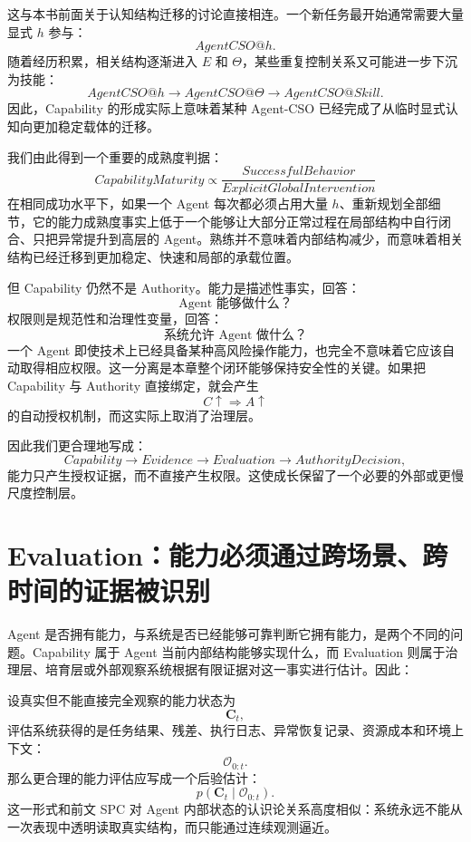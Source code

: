 这与本书前面关于认知结构迁移的讨论直接相连。一个新任务最开始通常需要大量显式 $h$ 参与：
\[
AgentCSO@h.
\]
随着经历积累，相关结构逐渐进入 $E$ 和 $\Theta$，某些重复控制关系又可能进一步下沉为技能：
\[
AgentCSO@h
\rightarrow
AgentCSO@\Theta
\rightarrow
AgentCSO@Skill.
\]
因此，Capability 的形成实际上意味着某种 Agent-CSO 已经完成了从临时显式认知向更加稳定载体的迁移。

我们由此得到一个重要的成熟度判据：
\[
\boxed{
CapabilityMaturity
\propto
\frac{
SuccessfulBehavior
}{
ExplicitGlobalIntervention
}
}
\]
在相同成功水平下，如果一个 Agent 每次都必须占用大量 $h$、重新规划全部细节，它的能力成熟度事实上低于一个能够让大部分正常过程在局部结构中自行闭合、只把异常提升到高层的 Agent。熟练并不意味着内部结构减少，而意味着相关结构已经迁移到更加稳定、快速和局部的承载位置。

但 Capability 仍然不是 Authority。能力是描述性事实，回答：
\[
\text{Agent 能够做什么？}
\]
权限则是规范性和治理性变量，回答：
\[
\text{系统允许 Agent 做什么？}
\]
一个 Agent 即使技术上已经具备某种高风险操作能力，也完全不意味着它应该自动取得相应权限。这一分离是本章整个闭环能够保持安全性的关键。如果把 Capability 与 Authority 直接绑定，就会产生
\[
C\uparrow
\Rightarrow
A\uparrow
\]
的自动授权机制，而这实际上取消了治理层。

因此我们更合理地写成：
\[
Capability
\rightarrow
Evidence
\rightarrow
Evaluation
\rightarrow
AuthorityDecision,
\]
能力只产生授权证据，而不直接产生权限。这使成长保留了一个必要的外部或更慢尺度控制层。

\section{Evaluation：能力必须通过跨场景、跨时间的证据被识别}

Agent 是否拥有能力，与系统是否已经能够可靠判断它拥有能力，是两个不同的问题。Capability 属于 Agent 当前内部结构能够实现什么，而 Evaluation 则属于治理层、培育层或外部观察系统根据有限证据对这一事实进行估计。因此：
\begin{statementbox}
\centering
{}
\end{statementbox}

设真实但不能直接完全观察的能力状态为
\[
\mathbf C_t,
\]
评估系统获得的是任务结果、残差、执行日志、异常恢复记录、资源成本和环境上下文：
\[
\mathcal O_{0:t}.
\]
那么更合理的能力评估应写成一个后验估计：
\[
p(
\mathbf C_t
\mid
\mathcal O_{0:t}
).
\]
这一形式和前文 SPC 对 Agent 内部状态的认识论关系高度相似：系统永远不能从一次表现中透明读取真实结构，而只能通过连续观测逼近。


